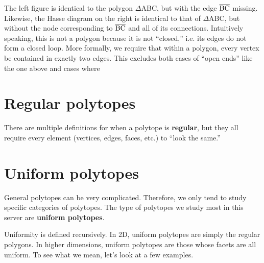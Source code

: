 \documentclass{article}
\begin{document}
\begin{center}
\end{center}

The left figure is identical to the polygon $\Delta$ABC,
but with the edge $\overline{\rm BC}$ missing.
Likewise, the Hasse diagram on the right is identical to that of $\Delta$ABC,
but without the node corresponding to $\overline{\rm BC}$ and all of its connections.
Intuitively speaking, this is not a polygon because it is not ``closed,''
i.e. its edges do not form a closed loop.
More formally, we require that within a polygon,
every vertex be contained in exactly two edges.
This excludes both cases of ``open ends'' like the one above
and cases where 

\section{Regular polytopes}
There are multiple definitions for when a polytope is \textbf{regular},
but they all require every element (vertices, edges, faces, etc.) to ``look the same.''

\section{Uniform polytopes}
General polytopes can be very complicated. Therefore, we only tend to study specific categories of polytopes. The type of polytopes we study most in this server are \textbf{uniform polytopes}.

Uniformity is defined recursively. In 2D, uniform polytopes are simply the regular polygons.
In higher dimensions, uniform polytopes are those whose facets are all uniform. To see what we mean, let's look at a few examples.
\end{document}
